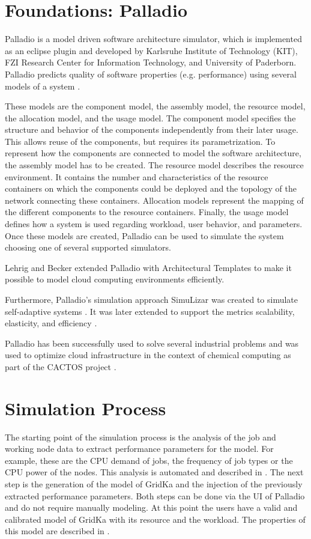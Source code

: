 \documentclass[runningheads,a4paper]{llncs}[2017/09/04]
\begin{document}
\section{Foundations: Palladio}
\label{sec:palladio}
Palladio is a model driven software architecture simulator, which is implemented as an eclipse plugin and developed by Karlsruhe Institute of Technology (KIT), FZI Research Center for Information Technology, and University of Paderborn. Palladio predicts quality of software properties (e.g. performance) using several models of a system \cite{BECKER20093}.

These models are the component model, the assembly model, the resource model, the allocation model, and the usage model.
The component model specifies the structure and behavior of the components independently from their later usage. This allows reuse of the components, but requires its parametrization.
To represent how the components are connected to model the software architecture, the assembly model has to be created. 
The resource model describes the resource environment. It contains the number and characteristics of the resource containers on which the components could be deployed and the topology of the network connecting these containers.
Allocation models represent the mapping of the different components to the resource containers.
Finally, the usage model defines how a system is used regarding workload, user behavior, and parameters.
Once these models are created, Palladio can be used to simulate the system choosing one of several supported simulators. 

Lehrig and Becker \cite{arch} extended Palladio with Architectural Templates to make it possible to model cloud computing environments efficiently.

Furthermore, Palladio's simulation approach SimuLizar was created to simulate self-adaptive systems \cite{becker2013simulizar}.
It was later extended to support the metrics scalability, elasticity, and efficiency \cite{arch}.

Palladio has been successfully used to solve several industrial problems and was used to optimize cloud infrastructure in the context of chemical computing as part of the CACTOS project \cite{rapidtesting}. 

\section{Simulation Process}
\label{sec:process}
The starting point of the simulation process is the analysis of the job and working node data to extract performance parameters for the model. For example, these are the CPU demand of jobs, the frequency of job types or the CPU power of the nodes. This analysis is automated and described in . The next step is the generation of the model of GridKa and the injection of the previously extracted performance parameters. Both steps can be done via the UI of Palladio and do not require manually modeling. At this point the users have a valid and calibrated model of GridKa with its resource and the workload. The properties of this model are described in .
\end{document}
